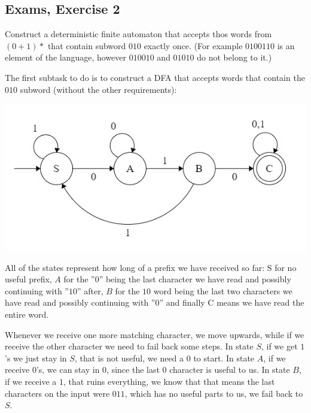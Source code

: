 \subsection {Exams, Exercise 2}


Construct a deterministic finite automaton that accepts thos words from $(0+1)*$ that contain subword $010$ exactly once. (For example $0100110$ is an element of the language, however $010010$ and $01010$ do not belong to it.)


The first subtask to do is to construct a DFA that accepts words that contain the $010$ subword (without the other requirements):

\begin{center}
    \includegraphics[width=\linewidth]{./exams/misc/02/step_1.png}
\end{center}

All of the states represent how long of a prefix we have received so far: S for no useful prefix, $A$ for the ''$0$'' being the last character we have read and possibly continuing with ''$10$'' after, $B$ for the $10$ word being the last two characters we have read and possibly continuing with ''$0$'' and finally C means we have read the entire word.

Whenever we receive one more matching character, we move upwards, while if we receive the other character we need to fail back some steps. In state $S$, if we get $1$'s we just stay in $S$, that is not useful, we need a $0$ to start. In state $A$, if we receive $0$'s, we can stay in $0$, since the last $0$ character is useful to us. In state $B$, if we receive a $1$, that ruins everything, we know that that means the last characters on the input were $011$, which has no useful parts to us, we fail back to $S$.

